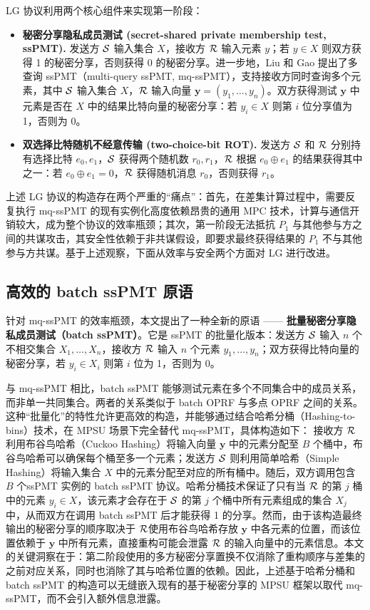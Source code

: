 LG 协议利用两个核心组件来实现第一阶段：
\begin{itemize}
    \item \textbf{秘密分享隐私成员测试 (secret-shared private membership test, ssPMT).} 发送方 $\mathcal{S}$ 输入集合 $X$，接收方 $\mathcal{R}$ 输入元素 $y$；若 $y \in X$ 则双方获得 1 的秘密分享，否则获得 0 的秘密分享。进一步地，Liu 和 Gao 提出了多查询 ssPMT（multi-query ssPMT, mq-ssPMT），支持接收方同时查询多个元素，其中 $\mathcal{S}$ 输入集合 $X$，$\mathcal{R}$ 输入向量 $\textbf{y} = (y_1, \dots, y_n)$。双方获得测试 $\textbf{y}$ 中元素是否在 $X$ 中的结果比特向量的秘密分享：若 $y_i \in X$ 则第 $i$ 位分享值为 1，否则为 0。
    \item \textbf{双选择比特随机不经意传输 (two-choice-bit ROT).} 发送方 $\mathcal{S}$ 和 $\mathcal{R}$ 分别持有选择比特 $e_0, e_1$，$\mathcal{S}$ 获得两个随机数 $r_0, r_1$，$\mathcal{R}$ 根据 $e_0 \oplus e_1$ 的结果获得其中之一：若 $e_0 \oplus e_1 = 0$，$\mathcal{R}$ 获得随机消息 $r_0$，否则获得 $r_1$。
\end{itemize}

上述 LG 协议的构造存在两个严重的“痛点”：首先，在差集计算过程中，需要反复执行 mq-ssPMT 的现有实例化高度依赖昂贵的通用 MPC 技术，计算与通信开销较大，成为整个协议的效率瓶颈；其次，第一阶段无法抵抗 $P_1$ 与其他参与方之间的共谋攻击，其安全性依赖于非共谋假设，即要求最终获得结果的 $P_1$ 不与其他参与方共谋。基于上述观察，下面从效率与安全两个方面对 LG 进行改进。

\subsection{高效的 batch ssPMT 原语}

针对 mq-ssPMT 的效率瓶颈，本文提出了一种全新的原语 —— \textbf{批量秘密分享隐私成员测试（batch ssPMT）}。它是 ssPMT 的批量化版本：发送方 $\mathcal{S}$ 输入 $n$ 个不相交集合 $X_1, \dots, X_n$，接收方 $\mathcal{R}$ 输入 $n$ 个元素 $y_1, \dots, y_n$；双方获得比特向量的秘密分享，若 $y_i \in X_i$ 则第 $i$ 位为 1，否则为 0。

与 mq-ssPMT 相比，batch ssPMT 能够测试元素在多个不同集合中的成员关系，而非单一共同集合。两者的关系类似于 batch OPRF \cite{KKRT-CCS-2016} 与多点 OPRF \cite{PRTY-CRYPTO-2019} 之间的关系。这种“批量化”的特性允许更高效的构造，并能够通过结合哈希分桶（Hashing-to-bins）技术，在 MPSU 场景下完全替代 mq-ssPMT，具体构造如下：
接收方 $\mathcal{R}$ 利用布谷鸟哈希（Cuckoo Hashing）将输入向量 $\textbf{y}$ 中的元素分配至 $B$ 个桶中，布谷鸟哈希可以确保每个桶至多一个元素；发送方 $\mathcal{S}$ 则利用简单哈希（Simple Hashing）将输入集合 $X$ 中的元素分配至对应的所有桶中。随后，双方调用包含 $B$ 个ssPMT 实例的 batch ssPMT 协议。哈希分桶技术保证了只有当 $\mathcal{R}$ 的第 $j$ 桶中的元素 $y_i \in X$，该元素才会存在于 $\mathcal{S}$ 的第 $j$ 个桶中所有元素组成的集合 $X_j$ 中，从而双方在调用 batch ssPMT 后才能获得 1 的分享。然而，由于该构造最终输出的秘密分享的顺序取决于 $\mathcal{R}$使用布谷鸟哈希存放 $\textbf{y}$ 中各元素的位置，而该位置依赖于 $\textbf{y}$ 中所有元素，直接重构可能会泄露 $\mathcal{R}$ 的输入向量中的元素信息。本文的关键洞察在于：第二阶段使用的多方秘密分享置换不仅消除了重构顺序与差集的之前对应关系，同时也消除了其与哈希位置的依赖。因此，上述基于哈希分桶和 batch ssPMT 的构造可以无缝嵌入现有的基于秘密分享的 MPSU 框架以取代 mq-ssPMT，而不会引入额外信息泄露。

